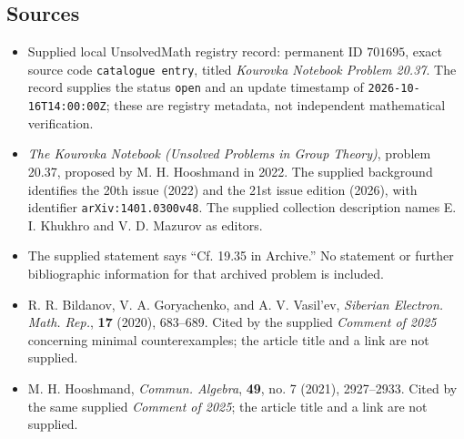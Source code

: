 \documentclass[11pt]{article}
\begin{document}
\subsection{Sources}
\begin{itemize}
\item Supplied local UnsolvedMath registry record: permanent ID \(701695\), exact source code \texttt{catalogue entry}, titled \emph{Kourovka Notebook Problem 20.37}. The record supplies the status \texttt{open} and an update timestamp of \texttt{2026-10-16T14:00:00Z}; these are registry metadata, not independent mathematical verification.
\item \emph{The Kourovka Notebook (Unsolved Problems in Group Theory)}, problem 20.37, proposed by M. H. Hooshmand in 2022. The supplied background identifies the 20th issue (2022) and the 21st issue edition (2026), with identifier \texttt{arXiv:1401.0300v48}. The supplied collection description names E. I. Khukhro and V. D. Mazurov as editors.
\item The supplied statement says ``Cf. 19.35 in Archive.'' No statement or further bibliographic information for that archived problem is included.
\item R. R. Bildanov, V. A. Goryachenko, and A. V. Vasil'ev, \emph{Siberian Electron. Math. Rep.}, \textbf{17} (2020), 683--689. Cited by the supplied \emph{Comment of 2025} concerning minimal counterexamples; the article title and a link are not supplied.
\item M. H. Hooshmand, \emph{Commun. Algebra}, \textbf{49}, no. 7 (2021), 2927--2933. Cited by the same supplied \emph{Comment of 2025}; the article title and a link are not supplied.
\end{itemize}
\end{document}
